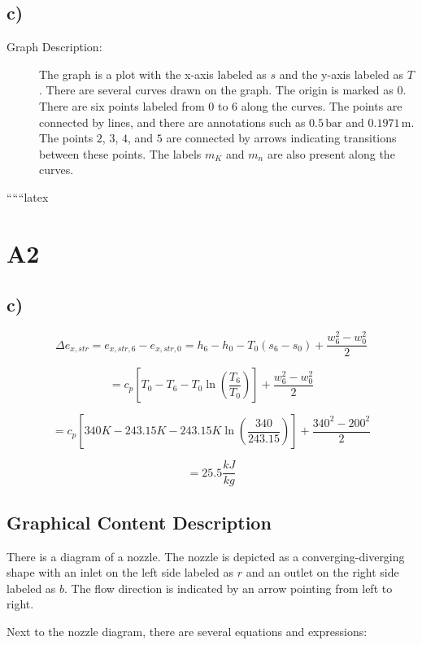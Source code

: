 

\subsection*{c)}

\begin{description}
    \item[Graph Description:] The graph is a plot with the x-axis labeled as $s$ and the y-axis labeled as $T$. There are several curves drawn on the graph. The origin is marked as $0$. There are six points labeled from $0$ to $6$ along the curves. The points are connected by lines, and there are annotations such as $0.5 \, \text{bar}$ and $0.1971 \, \text{m}$. The points $2$, $3$, $4$, and $5$ are connected by arrows indicating transitions between these points. The labels $m_K$ and $m_n$ are also present along the curves.
\end{description}

``````latex


\section*{A2}



\subsection*{c)}

\[
\Delta e_{x,str} = e_{x,str,6} - e_{x,str,0} = h_6 - h_0 - T_0 (s_6 - s_0) + \frac{w_6^2 - w_0^2}{2}
\]

\[
= c_p \left[ T_0 - T_6 - T_0 \ln \left( \frac{T_6}{T_0} \right) \right] + \frac{w_6^2 - w_0^2}{2}
\]

\[
= c_p \left[ 340K - 243.15K - 243.15K \ln \left( \frac{340}{243.15} \right) \right] + \frac{340^2 - 200^2}{2}
\]

\[
= 25.5 \frac{kJ}{kg}
\]

\subsection*{Graphical Content Description}

There is a diagram of a nozzle. The nozzle is depicted as a converging-diverging shape with an inlet on the left side labeled as $r$ and an outlet on the right side labeled as $b$. The flow direction is indicated by an arrow pointing from left to right.

Next to the nozzle diagram, there are several equations and expressions:

